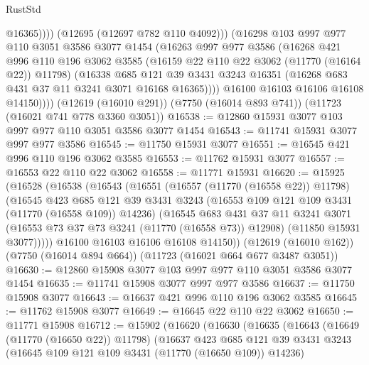 \begin{lexlean}{RustStd}
\begin{coremodule}
                    @16365))))
            (@12695 (@12697 @782 @110 @4092)))
          (@16298
            @103
            @997
            @977
            @110
            @3051
            @3586
            @3077
            @1454
            (@16263
              @997
              @977
              @3586
              (@16268
                @421
                @996
                @110
                @196
                @3062
                @3585
                (@16159 @22 @110 @22 @3062 (@11770 (@16164 @22)) @11798)
                (@16338
                  @685
                  @121
                  @39
                  @3431
                  @3243
                  @16351
                  (@16268 @683 @431 @37 @11 @3241 @3071 @16168 @16365))))
            @16100
            @16103
            @16106
            @16108
            @14150))))
    (@12619 (@16010 @291))
    (@7750 (@16014 @893 @741))
    (@11723 (@16021 @741 @778 @3360 @3051))
@16538 := @12860 @15931 @3077 @103 @997 @977 @110 @3051 @3586 @3077 @1454
@16543 := @11741 @15931 @3077 @997 @977 @3586
@16545 := @11750 @15931 @3077
@16551 := @16545 @421 @996 @110 @196 @3062 @3585
@16553 := @11762 @15931 @3077
@16557 := @16553 @22 @110 @22 @3062
@16558 := @11771 @15931
@16620 := @15925
    (@16528
      (@16538
        (@16543
          (@16551
            (@16557 (@11770 (@16558 @22)) @11798)
            (@16545
              @423
              @685
              @121
              @39
              @3431
              @3243
              (@16553 @109 @121 @109 @3431 (@11770 (@16558 @109)) @14236)
              (@16545
                @683
                @431
                @37
                @11
                @3241
                @3071
                (@16553 @73 @37 @73 @3241 (@11770 (@16558 @73)) @12908)
                (@11850 @15931 @3077)))))
        @16100
        @16103
        @16106
        @16108
        @14150))
    (@12619 (@16010 @162))
    (@7750 (@16014 @894 @664))
    (@11723 (@16021 @664 @677 @3487 @3051))
@16630 := @12860 @15908 @3077 @103 @997 @977 @110 @3051 @3586 @3077 @1454
@16635 := @11741 @15908 @3077 @997 @977 @3586
@16637 := @11750 @15908 @3077
@16643 := @16637 @421 @996 @110 @196 @3062 @3585
@16645 := @11762 @15908 @3077
@16649 := @16645 @22 @110 @22 @3062
@16650 := @11771 @15908
@16712 := @15902
    (@16620
      (@16630
        (@16635
          (@16643
            (@16649 (@11770 (@16650 @22)) @11798)
            (@16637
              @423
              @685
              @121
              @39
              @3431
              @3243
              (@16645 @109 @121 @109 @3431 (@11770 (@16650 @109)) @14236)

\end{coremodule}
\end{lexlean}
